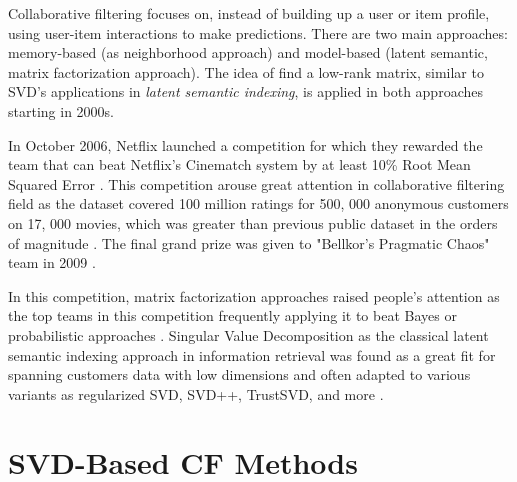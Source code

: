\documentclass[letter paper, 11pt]{article}
\begin{document}
	
	Collaborative filtering focuses on, instead of building up a user or item profile, using user-item interactions to make predictions. There are two main approaches: memory-based (as neighborhood approach) and model-based (latent semantic, matrix factorization approach). The idea of find a low-rank matrix, similar to SVD's applications in \textit{latent semantic indexing}, is applied in both approaches starting in 2000s.
	
	In October 2006, Netflix launched a competition for which they rewarded the team that can beat Netflix's Cinematch system by at least 10\% Root Mean Squared Error \cite{gower}. This competition arouse great attention in collaborative filtering field as the dataset covered 100 million ratings for 500, 000 anonymous customers on 17, 000 movies, which was greater than previous public dataset in the orders of magnitude \cite{MFinRS}. The final grand prize was given to "Bellkor's Pragmatic Chaos" team in 2009 \cite{gower} \cite{koren}. 
	
	
	In this competition, matrix factorization approaches raised people's attention as the top teams in this competition frequently applying it to beat Bayes or probabilistic approaches \cite{korenFactorization}. Singular Value Decomposition as the classical latent semantic indexing approach in information retrieval was found as a great fit for spanning customers data with low dimensions and often adapted to various variants as regularized SVD, SVD++,  TrustSVD, and more \cite{gower} \cite{SVD++performance} \cite{contextual} \cite{korenFactorization}. 
		
	
	
	\section{SVD-Based CF Methods}
\end{document}
